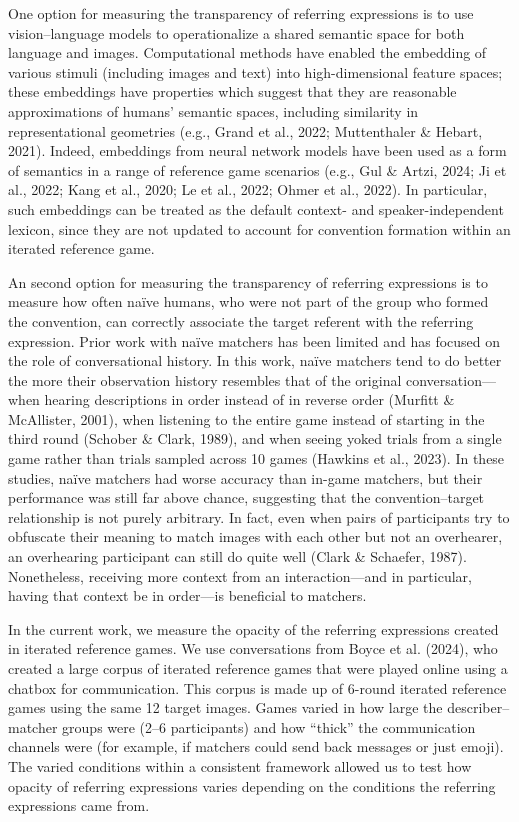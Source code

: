 \documentclass[10pt, letterpaper]{article}
\begin{document}
One option for measuring the transparency of referring expressions is to
use vision--language models to operationalize a shared semantic space
for both language and images. Computational methods have enabled the
embedding of various stimuli (including images and text) into
high-dimensional feature spaces; these embeddings have properties which
suggest that they are reasonable approximations of humans' semantic
spaces, including similarity in representational geometries (e.g., Grand
et al., 2022; Muttenthaler \& Hebart, 2021). Indeed, embeddings from
neural network models have been used as a form of semantics in a range
of reference game scenarios (e.g., Gul \& Artzi, 2024; Ji et al., 2022;
Kang et al., 2020; Le et al., 2022; Ohmer et al., 2022). In particular,
such embeddings can be treated as the default context- and
speaker-independent lexicon, since they are not updated to account for
convention formation within an iterated reference game.

An second option for measuring the transparency of referring expressions
is to measure how often naïve humans, who were not part of the group who
formed the convention, can correctly associate the target referent with
the referring expression. Prior work with naïve matchers has been
limited and has focused on the role of conversational history. In this
work, naïve matchers tend to do better the more their observation
history resembles that of the original conversation---when hearing
descriptions in order instead of in reverse order (Murfitt \&
McAllister, 2001), when listening to the entire game instead of starting
in the third round (Schober \& Clark, 1989), and when seeing yoked
trials from a single game rather than trials sampled across 10 games
(Hawkins et al., 2023). In these studies, naïve matchers had worse
accuracy than in-game matchers, but their performance was still far
above chance, suggesting that the convention--target relationship is not
purely arbitrary. In fact, even when pairs of participants try to
obfuscate their meaning to match images with each other but not an
overhearer, an overhearing participant can still do quite well (Clark \&
Schaefer, 1987). Nonetheless, receiving more context from an
interaction---and in particular, having that context be in order---is
beneficial to matchers.

In the current work, we measure the opacity of the referring expressions
created in iterated reference games. We use conversations from Boyce et
al. (2024), who created a large corpus of iterated reference games that
were played online using a chatbox for communication. This corpus is
made up of 6-round iterated reference games using the same 12 target
images. Games varied in how large the describer--matcher groups were
(2--6 participants) and how ``thick'' the communication channels were
(for example, if matchers could send back messages or just emoji). The
varied conditions within a consistent framework allowed us to test how
opacity of referring expressions varies depending on the conditions the
referring expressions came from.
\end{document}
